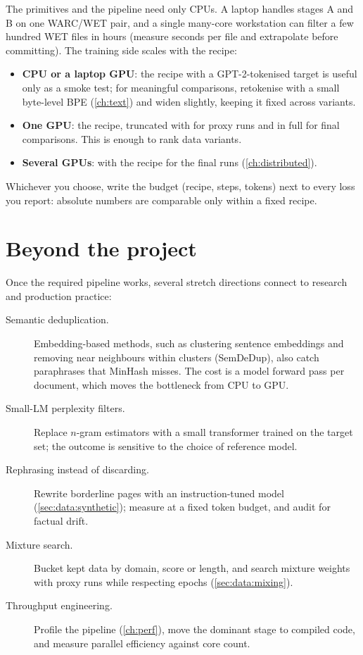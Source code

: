 The primitives and the pipeline need only CPUs. A laptop handles stages A and B on one WARC/WET pair, and a
single many-core workstation can filter a few hundred WET files in hours (measure seconds per file and
extrapolate before committing). The training side scales with the recipe:

\begin{itemize}
  \item \textbf{CPU or a laptop GPU}: the  recipe with a GPT-2-tokenised target is useful only as a smoke test;
        for meaningful comparisons, retokenise with a small byte-level BPE (\cref{ch:text}) and widen
         slightly, keeping it fixed across variants.
  \item \textbf{One GPU}: the  recipe, truncated with  for proxy runs and in full for
        final comparisons. This is enough to rank data variants.
  \item \textbf{Several GPUs}:  with the  recipe for the final runs
        (\cref{ch:distributed}).
\end{itemize}

Whichever you choose, write the budget (recipe, steps, tokens) next to every loss you report:
absolute numbers are comparable only within a fixed recipe.

\section{Beyond the project}\label{sec:proj4:beyond}

Once the required pipeline works, several stretch directions connect to research and production
practice:

\begin{description}
  \item[Semantic deduplication.] Embedding-based methods, such as clustering sentence embeddings and
  removing near neighbours within clusters (SemDeDup), also catch paraphrases that MinHash misses. The cost is a
  model forward pass per document, which moves the bottleneck from CPU to GPU.
  \item[Small-LM perplexity filters.] Replace $n$-gram estimators with a small transformer trained on
  the target set; the outcome is sensitive to the choice of reference model.
  \item[Rephrasing instead of discarding.] Rewrite borderline pages with an instruction-tuned model
  (\cref{sec:data:synthetic}); measure at a fixed token budget, and audit for factual drift.
  \item[Mixture search.] Bucket kept data by domain, score or length, and search mixture weights with
  proxy runs while respecting epochs (\cref{sec:data:mixing}).
  \item[Throughput engineering.] Profile the pipeline (\cref{ch:perf}), move the dominant stage to compiled
  code, and measure parallel efficiency against core count.
\end{description}

